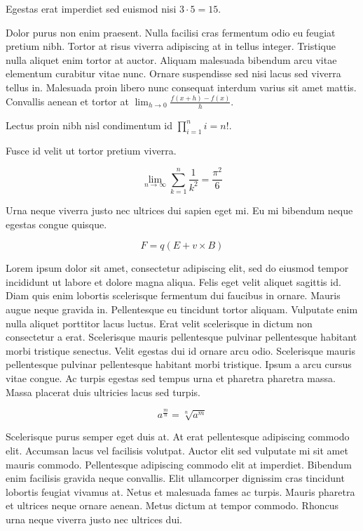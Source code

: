 \documentclass{article}
\begin{document}
	
    Egestas erat imperdiet sed euismod nisi 
    \begin{math}
    3\cdot5=15
    \end{math}.
    \newline
    
    Dolor purus non enim praesent. Nulla facilisi cras fermentum odio eu feugiat pretium nibh. Tortor at risus viverra adipiscing at in tellus integer. Tristique nulla aliquet enim tortor at auctor. Aliquam malesuada bibendum arcu vitae elementum curabitur vitae nunc. Ornare suspendisse sed nisi lacus sed viverra tellus in. Malesuada proin libero nunc consequat interdum varius sit amet mattis. Convallis aenean et tortor at $ \lim_{h\to 0}\frac{f(x+h)-f(x)}{h} $.
    \newline
    
    Lectus proin nibh nisl condimentum id \( \prod_{i=1}^ni=n! \).
    \newline
    
    Fusce id velit ut tortor pretium viverra.
    
    \[ \lim_{n \to \infty}\sum_{k=1}^n \frac{1}{k^2}= \frac{\pi^2}{6}  \]
    
    Urna neque viverra justo nec ultrices dui sapien eget mi. Eu mi bibendum neque egestas congue quisque.
    
    $$ F=q\left ( E+v \times B \right ) $$
    
    Lorem ipsum dolor sit amet, consectetur adipiscing elit, sed do eiusmod tempor incididunt ut labore et dolore magna aliqua. Felis eget velit aliquet sagittis id. Diam quis enim lobortis scelerisque fermentum dui faucibus in ornare. Mauris augue neque gravida in. Pellentesque eu tincidunt tortor aliquam. Vulputate enim nulla aliquet porttitor lacus luctus. Erat velit scelerisque in dictum non consectetur a erat. Scelerisque mauris pellentesque pulvinar pellentesque habitant morbi tristique senectus. Velit egestas dui id ornare arcu odio. Scelerisque mauris pellentesque pulvinar pellentesque habitant morbi tristique. Ipsum a arcu cursus vitae congue. Ac turpis egestas sed tempus urna et pharetra pharetra massa. Massa placerat duis ultricies lacus sed turpis.
    
    \begin{displaymath}
    	a^{\frac{m}{n}}=\sqrt[n]{a^{m}}
    \end{displaymath}
    
   Scelerisque purus semper eget duis at. At erat pellentesque adipiscing commodo elit. Accumsan lacus vel facilisis volutpat. Auctor elit sed vulputate mi sit amet mauris commodo. Pellentesque adipiscing commodo elit at imperdiet. Bibendum enim facilisis gravida neque convallis. Elit ullamcorper dignissim cras tincidunt lobortis feugiat vivamus at. Netus et malesuada fames ac turpis. Mauris pharetra et ultrices neque ornare aenean. Metus dictum at tempor commodo. Rhoncus urna neque viverra justo nec ultrices dui.
    
\end{document}
